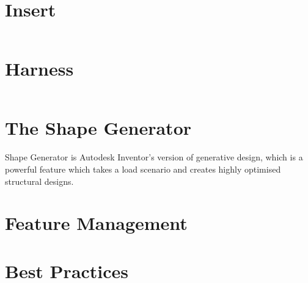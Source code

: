 \section{Insert}

$ $

\section{Harness}

$ $

\section{The Shape Generator}
Shape Generator is Autodesk Inventor's version of generative design, which is a powerful feature which takes a load scenario and creates highly optimised structural designs.

\section{Feature Management}

\section{Best Practices}